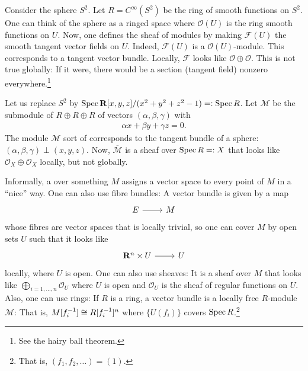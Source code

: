 \documentclass [11 pt, oneside] {article}
\begin{document}
\begin{example}[ ]\label{}\text{}
Consider the sphere $S^2$. Let $R= C^\infty(S^2)$ be the ring of smooth functions on $S^2$. One can think of the sphere as a ringed space where $\mathscr{O}(U)$ is the ring smooth functions on $U$. Now, one defines the sheaf of modules by making $\mathscr{F}(U)$ the smooth tangent vector fields on $U$. Indeed, $\mathscr{F}(U)$ is a $\mathscr{O}(U)$-module. This corresponds to a tangent vector bundle. Locally, $\mathscr{F}$ looks like $\mathscr{O}\oplus \mathscr{O}$. This is not true globally: If it were, there would be a section (tangent field) nonzero everywhere.\footnote{See the hairy ball theorem.} 
\end{example}

\begin{example}[ ]\label{}\text{}
Let us replace $S^2$ by $\operatorname{Spec} \mathbf{R}[x,y,z]/(x^2+y^2+z^2-1) =:\operatorname{Spec} R$. Let $\mathscr{M}$ be the submodule of $R\oplus R\oplus R$ of vectors $(\alpha,\beta,\gamma)$ with
\begin{align*}
	\alpha x + \beta y + \gamma z =0.
\end{align*}
The module $\mathscr{M}$ sort of corresponds to the tangent bundle of a sphere: $(\alpha,\beta,\gamma)\perp  (x,y,z)$. Now, $\overline{\mathscr{M}}$ is a sheaf over $\operatorname{Spec} R=:X$ that looks like $\mathscr{O}_X\oplus \mathscr{O}_X$ locally, but not globally.
\end{example}

Informally, a  over something $M$ assigns a vector space to every point of $M$ in a ``nice'' way. One can also use fibre bundles: A vector bundle is given by a map
\[
\begin{tikzcd}
	E\ar[r]&M
\end{tikzcd}
\]
whose fibres are vector spaces that is locally trivial, so one can cover $M$ by open sets $U$ such that it looks like
\[
\begin{tikzcd}
	\mathbf{R}^n \times U\ar[r] & U
\end{tikzcd}
\]
locally, where $U$ is open. One can also use sheaves: It is a sheaf over $M$ that looks like $\bigoplus_{i=1,\hdots, n}\mathscr{O}_U$ where $U$ is open and $\mathscr{O}_U$ is the sheaf of regular functions on $U$. Also, one can use rings: If $R$ is a ring, a vector bundle is a locally free $R$-module $\mathscr{M}$: That is, $\relax{M}[f_i^{-1}] \cong R[f_i^{-1}]^n$ where $\{U(f_i)\}$ covers $\operatorname{Spec} R$.\footnote{That is, $(f_1,f_2,\hdots)=(1)$.}
\end{document}
